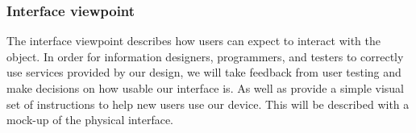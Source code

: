 
            
            
        
        
    \subsubsection{Interface viewpoint}
        The interface viewpoint describes how users can expect to interact with the object.
        In order for information designers, programmers, and testers to correctly use services provided by our design, we will take feedback from user testing and make decisions on how usable our interface is. As well as provide a simple visual set of instructions to help new users use our device.
        This will be described with a mock-up of the physical interface.

        
        
        
            

